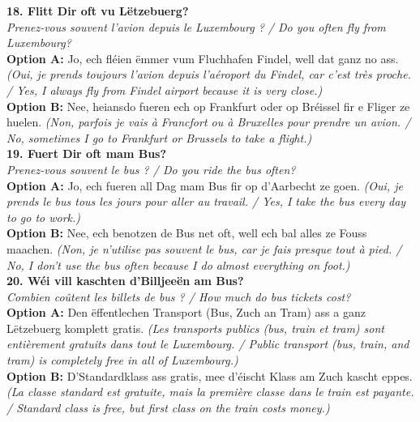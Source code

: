 \noindent\textbf{18. Flitt Dir oft vu Lëtzebuerg?}\\
\textit{Prenez-vous souvent l'avion depuis le Luxembourg ? / Do you often fly from Luxembourg?}\\
\textbf{Option A:} Jo, ech fléien ëmmer vum Fluchhafen Findel, well dat ganz no ass. \textit{(Oui, je prends toujours l'avion depuis l'aéroport du Findel, car c'est très proche. / Yes, I always fly from Findel airport because it is very close.)}\\
\textbf{Option B:} Nee, heiansdo fueren ech op Frankfurt oder op Bréissel fir e Fliger ze huelen. \textit{(Non, parfois je vais à Francfort ou à Bruxelles pour prendre un avion. / No, sometimes I go to Frankfurt or Brussels to take a flight.)}\\[1em]

\noindent\textbf{19. Fuert Dir oft mam Bus?}\\
\textit{Prenez-vous souvent le bus ? / Do you ride the bus often?}\\
\textbf{Option A:} Jo, ech fueren all Dag mam Bus fir op d'Aarbecht ze goen. \textit{(Oui, je prends le bus tous les jours pour aller au travail. / Yes, I take the bus every day to go to work.)}\\
\textbf{Option B:} Nee, ech benotzen de Bus net oft, well ech bal alles ze Fouss maachen. \textit{(Non, je n'utilise pas souvent le bus, car je fais presque tout à pied. / No, I don't use the bus often because I do almost everything on foot.)}\\[1em]

\noindent\textbf{20. Wéi vill kaschten d’Billjeeën am Bus?}\\
\textit{Combien coûtent les billets de bus ? / How much do bus tickets cost?}\\
\textbf{Option A:} Den ëffentlechen Transport (Bus, Zuch an Tram) ass a ganz Lëtzebuerg komplett gratis. \textit{(Les transports publics (bus, train et tram) sont entièrement gratuits dans tout le Luxembourg. / Public transport (bus, train, and tram) is completely free in all of Luxembourg.)}\\
\textbf{Option B:} D'Standardklass ass gratis, mee d'éischt Klass am Zuch kascht eppes. \textit{(La classe standard est gratuite, mais la première classe dans le train est payante. / Standard class is free, but first class on the train costs money.)}\\[1em]

